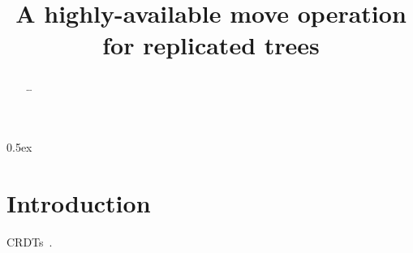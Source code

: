 \documentclass[10pt]{article}
\begin{document}
\title{A highly-available move operation for replicated trees}
\author{}
\maketitle

\begin{abstract}
    \dots
\end{abstract}

\tableofcontents

\parindent 0pt\parskip 0.5ex

\section {Introduction}

CRDTs~\cite{Shapiro:2011un}.





\end{document}
